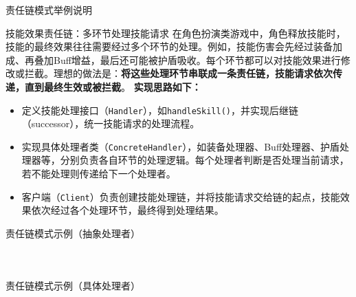 \documentclass[UTF8,aspectratio=169]{beamer}
\begin{document}
\begin{frame}{责任链模式举例说明}
    \begin{exampleytublock}{技能效果责任链：多环节处理技能请求}
        在角色扮演类游戏中，角色释放技能时，技能的最终效果往往需要经过多个环节的处理。例如，技能伤害会先经过装备加成、再叠加Buff增益，最后还可能被护盾吸收。每个环节都可以对技能效果进行修改或拦截。理想的做法是：\textbf{将这些处理环节串联成一条责任链，技能请求依次传递，直到最终生效或被拦截}。
        \textbf{实现思路如下：}
        \begin{itemize}
            \item 定义技能处理接口（\texttt{Handler}），如\texttt{handleSkill()}，并实现后继链（successor），统一技能请求的处理流程。
            \item 实现具体处理者类（\texttt{ConcreteHandler}），如装备处理器、Buff处理器、护盾处理器等，分别负责各自环节的处理逻辑。每个处理者判断是否处理当前请求，若不能处理则传递给下一个处理者。
            \item 客户端（\texttt{Client}）负责创建技能处理链，并将技能请求交给链的起点，技能效果依次经过各个处理环节，最终得到处理结果。
        \end{itemize}
    \end{exampleytublock}
\end{frame}

\begin{frame}{责任链模式示例（抽象处理者）}
    \begin{columns}
        \begin{column}{0.48\textwidth}
            \inputminted[firstline=1, lastline=18]{cpp}{code/chain_of_responsibility_pattern.cpp}
        \end{column}
        \begin{column}{0.48\textwidth}
            \inputminted[firstline=20, lastline=36]{cpp}{code/chain_of_responsibility_pattern.cpp}
        \end{column}
    \end{columns}
\end{frame}

\begin{frame}{责任链模式示例（具体处理者）}
    \begin{columns}
        \begin{column}{0.48\textwidth}
            \inputminted[firstline=38, lastline=49]{cpp}{code/chain_of_responsibility_pattern.cpp}
        \end{column}
        \begin{column}{0.48\textwidth}
            \inputminted[firstline=51, lastline=62]{cpp}{code/chain_of_responsibility_pattern.cpp}
        \end{column}
    \end{columns}
\end{frame}
\end{document}
